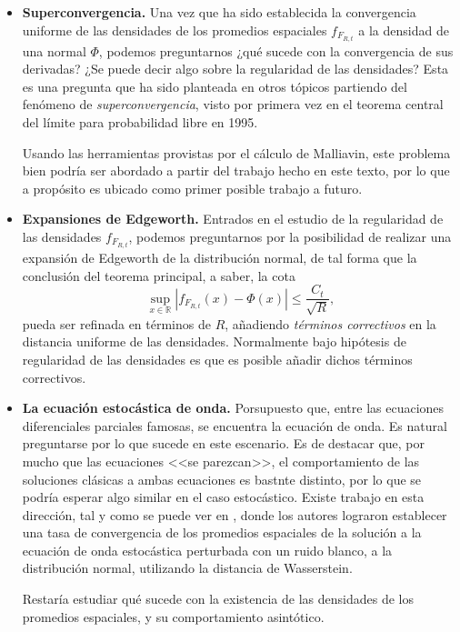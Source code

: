 \documentclass[letterpaper,twoside,12pt]{book}
\newcommand{\R}{\mathbb{R}}
\newcommand{\1}{\mathds{1}}
\newcommand{\abs}[1]{\left\lvert #1 \right\rvert}
\theoremstyle{definition}
\theoremstyle{definition}
\theoremstyle{remark}
\theoremstyle{definition}
\theoremstyle{definition}
\theoremstyle{definition}
\theoremstyle{definition}
\theoremstyle{definition}
\begin{document}
\begin{itemize}
   \item \textbf{Superconvergencia.} Una vez que ha sido establecida la convergencia uniforme de las densidades de los promedios espaciales $f_{F_{R,t}}$ a la densidad de una normal $\Phi$, podemos preguntarnos ¿qué sucede con la convergencia de sus derivadas? ¿Se puede decir algo sobre la regularidad de las densidades? Esta es una pregunta que ha sido planteada en otros tópicos partiendo del fenómeno de \textit{superconvergencia}, visto por primera vez en el teorema central del límite para probabilidad libre en 1995.
   
   Usando las herramientas provistas por el cálculo de Malliavin, este problema bien podría ser abordado a partir del trabajo hecho en este texto, por lo que a propósito es ubicado como primer posible trabajo a futuro.
   \item \textbf{Expansiones de Edgeworth.} Entrados en el estudio de la regularidad de las densidades $f_{F_{R,t}}$, podemos preguntarnos por la posibilidad de realizar una expansión de Edgeworth de la distribución normal, de tal forma que la conclusión del teorema principal, a saber, la cota 
   \[
   \sup_{x\in \R} \abs{f_{F_{R,t}}(x)-\Phi(x)}\leq \frac{C_t}{\sqrt{R}},
   \]
   pueda ser refinada en términos de $R$, añadiendo \textit{términos correctivos} en la distancia uniforme de las densidades. Normalmente bajo hipótesis de regularidad de las densidades es que es posible añadir dichos términos correctivos.

   \item \textbf{La ecuación estocástica de onda.} Porsupuesto que, entre las ecuaciones diferenciales parciales famosas, se encuentra la ecuación de onda. Es natural preguntarse por lo que sucede en este escenario. Es de destacar que, por mucho que las ecuaciones <<se parezcan>>, el comportamiento de las soluciones clásicas a ambas ecuaciones es bastnte distinto, por lo que se podría esperar algo similar en el caso estocástico. Existe trabajo en esta dirección, tal y como se puede ver en \cite{tudor2024spatialaveragesolutionsspdes}, donde los autores lograron establecer una tasa de convergencia de los promedios espaciales de la solución a la ecuación de onda estocástica perturbada con un ruido blanco, a la distribución normal, utilizando la distancia de Wasserstein.
   
   Restaría estudiar qué sucede con la existencia de las densidades de los promedios espaciales, y su comportamiento asintótico.


\end{itemize}
\end{document}
